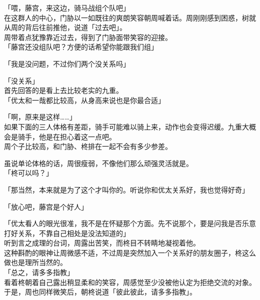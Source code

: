 「喂，藤宫，来这边，骑马战组个队吧」\\

在这群人的中心，门胁以一如既往的爽朗笑容朝周喊着话。周刚刚感到困惑，树就从周的背后往前推他，说道「过去吧」。\\

周带着点犹豫靠近过去，得到了门胁面带笑容的迎接。\\

「藤宫还没组队吧？方便的话希望你能跟我们组」

「我是没问题，不过你们两个没关系吗」

「没关系」\\

首先回答的是看上去比较老实的九重。\\

「优太和一哉都比较高，从身高来说也是你最合适」

「啊，原来是这样……」\\

如果下面的三人体格有差距，骑手可能难以骑上来，动作也会变得迟缓。九重大概会是骑手，他是在担心着这一点吧。\\

周个子比较高，和门胁、柊排在一起不会有多少参差。

虽说单论体格的话，周很瘦弱，不像他们那么顽强灵活就是。\\

「柊可以吗？」

「那当然，本来就是为了这个才叫你的。听说你和优太关系好，我也觉得好奇」

「放心吧，藤宫是个好人」

「优太看人的眼光很准，我不是在怀疑那个方面。先不说那个，要是问我是否乐意打好关系，不靠自己相处是没法知道的」\\

听到言之成理的台词，周露出苦笑，而柊目不转睛地凝视着他。\\

这种斟酌的眼神让周微感不适，不过周是突然加入一个关系好的朋友圈子，柊这么做也是理所当然的。\\

「总之，请多多指教」\\

看着柊朝着自己露出稍显柔和的笑容，周感觉至少没被他认定为拒绝交流的对象。于是，周也同样微笑后，朝柊说道「彼此彼此，请多多指教」。
